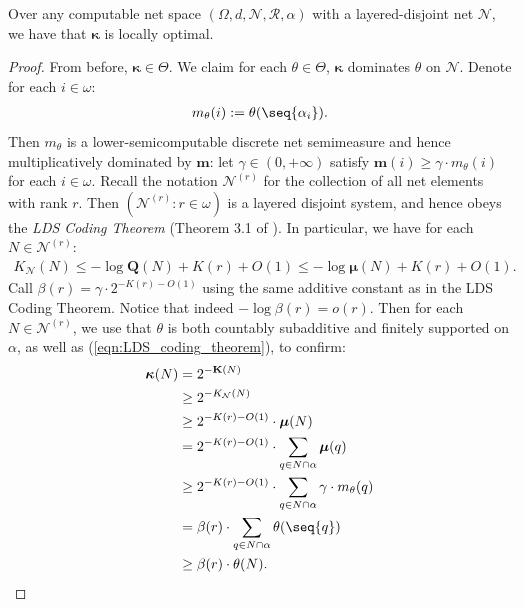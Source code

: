 \begin{theorem}
    \label{theorem:kappa_is_locally_optimal_for_layered_disjoint_nets}
    Over any computable net space $(\Omega, d, \mathcal{N}, \mathscr{R}, \alpha)$ with a layered-disjoint net $\mathcal{N}$, we have that $\boldsymbol{\kappa}$ is locally optimal.
\end{theorem}
\begin{proof}
    From before, $\boldsymbol{\kappa} \in \Theta$. We claim for each $\theta \in \Theta$, $\boldsymbol{\kappa}$ dominates $\theta$ on $\mathcal{N}$. Denote for each $i \in \omega$:
    \begin{align*}
        m_\theta(i) := \theta(\seq{\alpha_i}).
    \end{align*}
    Then $m_\theta$ is a lower-semicomputable discrete net semimeasure and hence multiplicatively dominated by $\mathbf{m}$: let $\gamma \in (0, +\infty)$ satisfy $\mathbf{m}(i) \geq \gamma \cdot m_\theta(i)$ for each $i \in \omega$. Recall the notation $\mathcal{N}^{(r)}$ for the collection of all net elements with rank $r$. Then $(\mathcal{N}^{(r)} : r \in \omega)$ is a layered disjoint system, and hence obeys the \textit{LDS Coding Theorem} (Theorem 3.1 of \cite{CL14}). In particular, we have for each $N \in \mathcal{N}^{(r)}$:
    \begin{align}
        \label{eqn:LDS_coding_theorem}
        K_{\mathcal{N}}(N) \leq -\log \mathbf{Q}(N) + K(r) + O(1) \leq -\log \boldsymbol{\mu}(N) + K(r) + O(1).
    \end{align}
    Call $\beta(r) = \gamma \cdot 2^{-K(r) - O(1)}$ using the same additive constant as in the LDS Coding Theorem. Notice that indeed $-\log \beta(r) = o(r)$. Then for each $N \in \mathcal{N}^{(r)}$, we use that $\theta$ is both countably subadditive and finitely supported on $\alpha$, as well as (\ref{eqn:LDS_coding_theorem}), to confirm:
    \begin{align*}
        \boldsymbol{\kappa}(N) &= 2^{-\mathbf{K}(N)}\\
            &\geq 2^{-K_{\mathcal{N}}(N)}\\
            &\geq 2^{-K(r) - O(1)} \cdot \boldsymbol{\mu}(N)\\
            &= 2^{-K(r) - O(1)} \cdot \sum_{q \in N \cap \alpha} \boldsymbol{\mu}(q)\\
            &\geq 2^{-K(r) - O(1)} \cdot \sum_{q \in N \cap \alpha} \gamma \cdot m_\theta(q)\\
            &= \beta(r) \cdot \sum_{q \in N \cap \alpha} \theta(\seq{q})\\
            &\geq \beta(r) \cdot \theta(N).
    \end{align*}
\end{proof}

